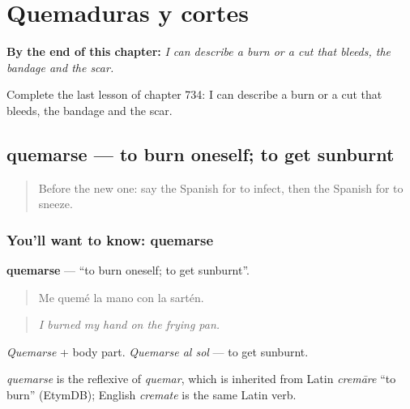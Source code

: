 
\chapter{Quemaduras y cortes}
\label{ch:es-quemaduras-y-cortes}

\begin{chapteropening}
\textbf{By the end of this chapter:} \emph{I can describe a burn or a cut that bleeds, the bandage and the scar.}

Complete the last lesson of chapter 734: I can describe a burn or a cut that bleeds, the bandage and the scar.
\end{chapteropening}

\section[quemarse]{quemarse — to burn oneself; to get sunburnt}

\label{lesson:ES-C734-quemarse}



\begin{quote}
Before the new one: say the Spanish for to infect, then the Spanish for to sneeze.
\end{quote}

\subsection*{You'll want to know: quemarse}
\textbf{quemarse} — \textquotedblleft{}to burn oneself; to get sunburnt\textquotedblright{}.

\begin{quote}
Me quemé la mano con la sartén.
\end{quote}

\begin{quote}
\emph{I burned my hand on the frying pan.}
\end{quote}

\emph{Quemarse} + body part. \emph{Quemarse al sol} — to get sunburnt.

\begin{cousinweb}
\emph{quemarse} is the reflexive of \emph{quemar}, which is inherited from Latin \emph{cremāre} \textquotedblleft{}to burn\textquotedblright{} (EtymDB); English \emph{cremate} is the same Latin verb.
\end{cousinweb}

